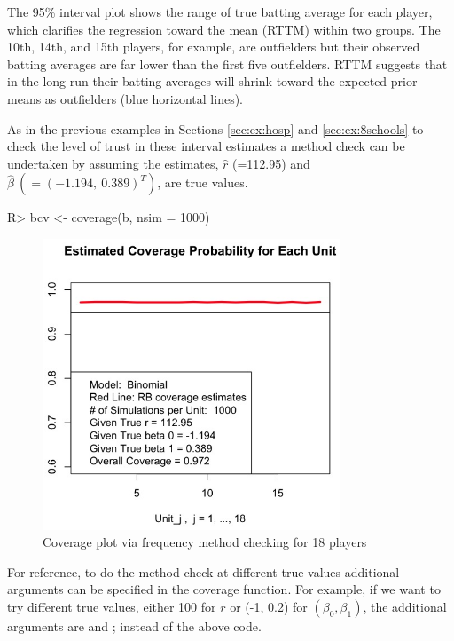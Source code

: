 \documentclass[article]{jss}
\begin{document}
The 95\% interval plot shows the range of true batting average for each player, which clarifies the regression toward the mean (RTTM) within two groups. The 10th, 14th, and 15th players, for example, are outfielders but their observed batting averages are far lower than the first five outfielders. RTTM suggests that in the long run their batting averages will shrink toward the expected prior means as outfielders (blue horizontal lines).


As in the previous examples in Sections \ref{sec:ex:hosp} and \ref{sec:ex:8schools} to check the level of trust in these interval estimates a method check can be undertaken by assuming the estimates, $\hat{r}$ (=112.95) and $\hat{\beta}~(=(-1.194, ~0.389)^{T})$, are true values. 

\begin{CodeChunk}
\begin{CodeInput}
R> bcv <- coverage(b, nsim = 1000) 
\end{CodeInput}
\end{CodeChunk}
\begin{figure}[h]
\begin{center}
\includegraphics[width = 3.5in]{baseball2.png}
\caption{Coverage plot via frequency method checking for 18 players}
\label{fig:baseball2}
\end{center}
\end{figure}

For reference, to do the method check at different true values additional arguments can be specified in the coverage function. For example, if we want to try different true values, either 100 for $r$ or (-1, 0.2) for $(\beta_{0}, \beta_{1})$, the additional arguments are  and ;  instead of the above code.
\end{document}

